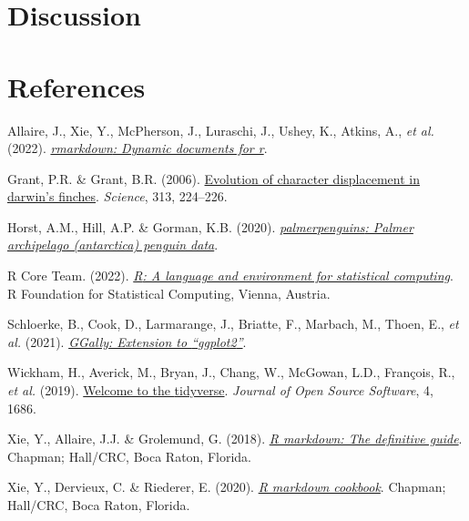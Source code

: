\documentclass[
]{article}
\newlength{\cslhangindent}
\newlength{\cslentryspacingunit} %
\newenvironment{CSLReferences}[2] %
 {%
  \setlength{\parindent}{0pt}
  \ifodd #1
  \let\oldpar\par
  \def\par{\hangindent=\cslhangindent\oldpar}
  \fi
  \setlength{\parskip}{#2\cslentryspacingunit}
 }%
 {}
\begin{document}
\hypertarget{discussion}{%
\section{Discussion}\label{discussion}}

\hypertarget{references}{%
\section*{References}\label{references}}

\hypertarget{refs}{}
\begin{CSLReferences}{1}{0}
\leavevmode{}%
Allaire, J., Xie, Y., McPherson, J., Luraschi, J., Ushey, K., Atkins,
A., \emph{et al.} (2022).
\emph{\href{https://github.com/rstudio/rmarkdown}{{rmarkdown}: Dynamic
documents for r}}.

\leavevmode{}%
Grant, P.R. \& Grant, B.R. (2006).
\href{https://doi.org/10.1126/science.1128374}{Evolution of character
displacement in darwin's finches}. \emph{Science}, 313, 224--226.

\leavevmode{}%
Horst, A.M., Hill, A.P. \& Gorman, K.B. (2020).
\emph{\href{https://doi.org/10.5281/zenodo.3960218}{{palmerpenguins}:
Palmer archipelago (antarctica) penguin data}}.

\leavevmode{}%
R Core Team. (2022). \emph{\href{https://www.R-project.org/}{{R}: A
language and environment for statistical computing}}. R Foundation for
Statistical Computing, Vienna, Austria.

\leavevmode{}%
Schloerke, B., Cook, D., Larmarange, J., Briatte, F., Marbach, M.,
Thoen, E., \emph{et al.} (2021).
\emph{\href{https://CRAN.R-project.org/package=GGally}{{GGally}:
Extension to {``{ggplot2}''}}}.

\leavevmode{}%
Wickham, H., Averick, M., Bryan, J., Chang, W., McGowan, L.D., François,
R., \emph{et al.} (2019).
\href{https://doi.org/10.21105/joss.01686}{Welcome to the {tidyverse}}.
\emph{Journal of Open Source Software}, 4, 1686.

\leavevmode{}%
Xie, Y., Allaire, J.J. \& Grolemund, G. (2018).
\emph{\href{https://bookdown.org/yihui/rmarkdown}{R markdown: The
definitive guide}}. Chapman; Hall/CRC, Boca Raton, Florida.

\leavevmode{}%
Xie, Y., Dervieux, C. \& Riederer, E. (2020).
\emph{\href{https://bookdown.org/yihui/rmarkdown-cookbook}{R markdown
cookbook}}. Chapman; Hall/CRC, Boca Raton, Florida.

\end{CSLReferences}
\end{document}
